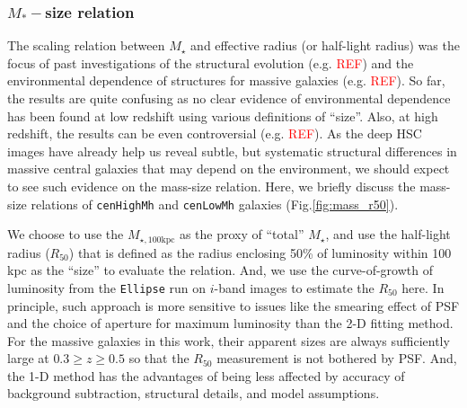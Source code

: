 \documentclass{emulateapj}
\def\rbcg{\texttt{cenHighMh}}
\def\nbcg{\texttt{cenLowMh}}
\def\mstar{{$M_{\star}$}}
\def\mtot{{$M_{\star,100\mathrm{kpc}}$}}
\newcommand{\addref}{{\textcolor{red}{REF}}}
\begin{document}
\begin{CJK*}{UTF8}{gbsn}
\subsubsection{$M_{\ast}-$size relation}
    \label{sssec:mass_size}
        
    The scaling relation between \mstar{} and effective radius (or half-light radius) 
    was the focus of past investigations of the structural evolution (e.g. \addref) and 
    the environmental dependence of structures for massive galaxies (e.g. \addref{}). 
    So far, the results are quite confusing as no clear evidence of environmental 
    dependence has been found at low redshift using various definitions of ``size''. 
    Also, at high redshift, the results can be even controversial
    (e.g. \addref).  
    As the deep HSC images have already help us reveal subtle, but systematic structural
    differences in massive central galaxies that may depend on the environment, we should 
    expect to see such evidence on the mass-size relation. 
    Here, we briefly discuss the mass-size relations of \rbcg{} and \nbcg{}
    galaxies (Fig.\ref{fig:mass_r50}).
     
    We choose to use the \mtot{} as the proxy of ``total'' \mstar{}, and use the 
    half-light radius ($R_{\mathrm{50}}$) that is defined as the radius enclosing 50\% of 
    luminosity within 100 kpc as the ``size'' to evaluate the relation.
    And, we use the curve-of-growth of luminosity from the \texttt{Ellipse} run on 
    $i$-band images to estimate the $R_{\mathrm{50}}$ here.
    In principle, such approach is more sensitive to issues like the smearing effect of 
    PSF and the choice of aperture for maximum luminosity than the 2-D fitting method.
    For the massive galaxies in this work, their apparent sizes are always sufficiently 
    large at $0.3 \geq z \geq 0.5$ so that the $R_{\mathrm{50}}$ measurement is not 
    bothered by PSF.   
    And, the 1-D method has the advantages of being less affected by accuracy of background
    subtraction, structural details, and model assumptions.
    

\end{CJK*}
\end{document}

